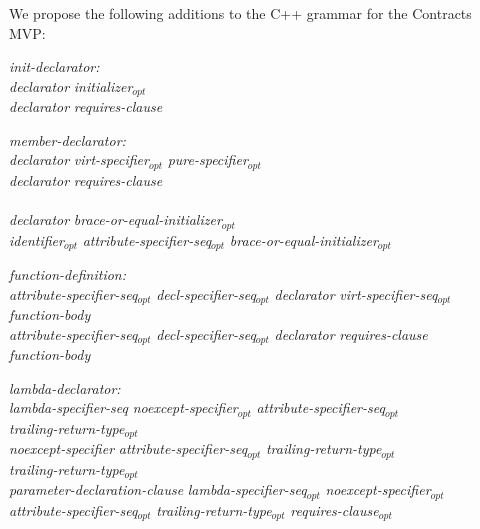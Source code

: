 We propose the following additions to the C++ grammar for the Contracts MVP:

\begin{adjustwidth}{0.5cm}{0.5cm}

\emph{init-declarator:} \\
\phantom{~~~}\emph{declarator} \emph{initializer}$_{opt}$ \\
\phantom{~~~}\emph{declarator} \emph{requires-clause} \\
\phantom{~~~}

\emph{member-declarator:} \\
\phantom{~~~}\emph{declarator} \emph{virt-specifier}$_{opt}$ \emph{pure-specifier}$_{opt}$  \\
\phantom{~~~}\emph{declarator} \emph{requires-clause} \\
\phantom{~~~} \\
\phantom{~~~}\emph{declarator} \emph{brace-or-equal-initializer}$_{opt}$ \\
\phantom{~~~}\emph{identifier}$_{opt}$ \emph{attribute-specifier-seq}$_{opt}$ \tcode{:} \emph{brace-or-equal-initializer}$_{opt}$

\emph{function-definition:} \\
\phantom{~~~}\emph{attribute-specifier-seq}$_{opt}$ \emph{decl-specifier-seq}$_{opt}$ \emph{declarator} \emph{virt-specifier-seq}$_{opt}$  \\
\phantom{~~~~~~} \emph{function-body}\\
\phantom{~~~}\emph{attribute-specifier-seq}$_{opt}$ \emph{decl-specifier-seq}$_{opt}$ \emph{declarator} \emph{requires-clause} \\ 
\phantom{~~~~~~} \emph{function-body}

\emph{lambda-declarator:} \\
\phantom{~~~}\emph{lambda-specifier-seq} \emph{noexcept-specifier}$_{opt}$ \emph{attribute-specifier-seq}$_{opt}$ \\
\phantom{~~~~~~}\emph{trailing-return-type}$_{opt}$ \\
\phantom{~~~}\emph{noexcept-specifier} \emph{attribute-specifier-seq}$_{opt}$ \emph{trailing-return-type}$_{opt}$  \\
\phantom{~~~}\emph{trailing-return-type}$_{opt}$ \\
\phantom{~~~}\tcode{(} \emph{parameter-declaration-clause} \tcode{)} \emph{lambda-specifier-seq}$_{opt}$ \emph{noexcept-specifier}$_{opt}$ \\ \phantom{~~~~~~}\emph{attribute-specifier-seq}$_{opt}$ \emph{trailing-return-type}$_{opt}$ \emph{requires-clause}$_{opt}$ 


\end{adjustwidth}
